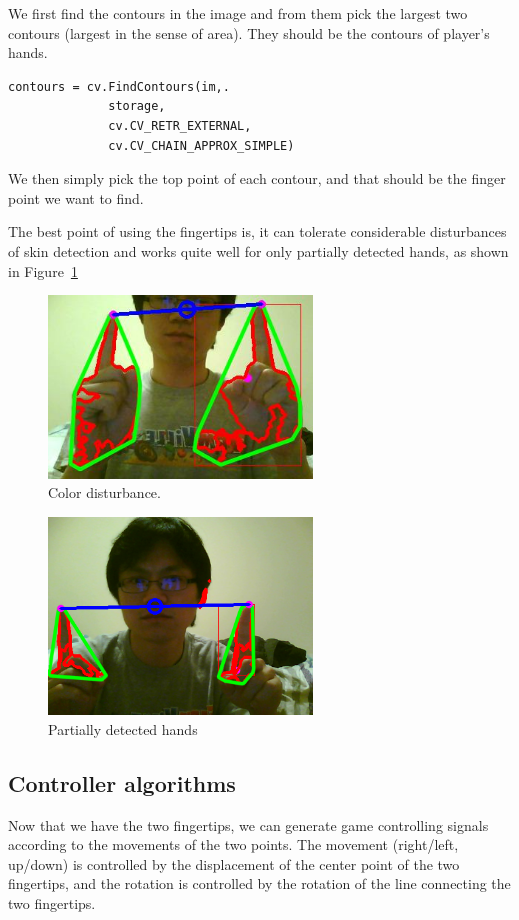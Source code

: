 \documentclass[10pt,twocolumn,letterpaper]{article}
\begin{document}
We first find the contours in the image and from them pick the 
largest two contours (largest in the sense of area). They should 
be the contours of player’s hands. 

\begin{verbatim}
contours = cv.FindContours(im,.
              storage,
              cv.CV_RETR_EXTERNAL,
              cv.CV_CHAIN_APPROX_SIMPLE)
\end{verbatim}

We then simply pick the top point of each contour, and that 
should be the finger point we want to find.

The best point of using the fingertips is, it can tolerate 
considerable disturbances of skin detection and works quite 
well for only partially detected hands, as shown in Figure~\ref{fig:fingertip}

\begin{figure}[h]
\centering
\includegraphics[width=7cm]{fingertip.png}
\caption{Color disturbance.}
\label{fig:fingertip}
\end{figure}

\begin{figure}[h]
\centering
\includegraphics[width=7cm]{partialhand.png}
\caption{Partially detected hands}
\label{fig:partial hand}
\end{figure}

\subsection{Controller algorithms}
Now that we have the two fingertips, we can generate game 
controlling signals according to the movements of the two points. 
The movement (right/left, up/down) is controlled by the 
displacement of the center point of the two fingertips, and 
the rotation is controlled by the rotation of the line connecting 
the two fingertips. 
\end{document}
